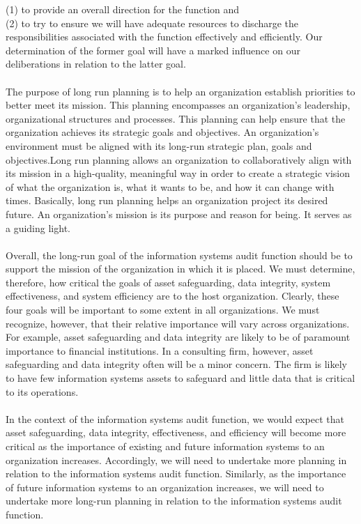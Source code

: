 \documentclass[12pt]{article}
\begin{document}
(1) to provide an overall direction for the function and\\ 
(2) to try to ensure we will have adequate resources to discharge the responsibilities associated with the function effectively and efficiently. Our determination of the former goal will have a marked influence on our deliberations in relation to the latter goal.\\\\
The purpose of long run planning is to help an organization establish priorities to better meet its mission. This planning encompasses an organization’s leadership, organizational structures and processes. This planning can help ensure that the organization achieves its strategic goals and objectives. An organization’s environment must be aligned with its long-run strategic plan, goals and objectives.Long run planning allows an organization to collaboratively align with its mission in a high-quality, meaningful way in order to create a strategic vision of what the organization is, what it wants to be, and how it can change with times. Basically, long run planning helps an organization project its desired future. An organization’s mission is its purpose and reason for being. It serves as a guiding light. \\\\
Overall, the long-run goal of the information systems audit function should be to support the mission of the organization in which it is placed. We must determine, therefore, how critical the goals of asset safeguarding, data integrity, system effectiveness, and system efficiency are to the host organization. Clearly, these four goals will be important to some extent in all organizations. We must recognize, however, that their relative importance will vary across organizations. For example, asset safeguarding and data integrity are likely to be of paramount importance to financial institutions. In a consulting firm, however, asset safeguarding and data integrity often will be a minor concern. The firm is likely to have few information systems assets to safeguard and little data that is critical to its operations.\\\\
In the context of the information systems audit function, we would expect that asset safeguarding, data integrity, effectiveness, and efficiency will become more critical as the importance of existing and future information systems to an organization increases. Accordingly, we will need to undertake more planning in relation to the information systems audit function. Similarly, as the importance of future information systems to an organization increases, we will need to undertake more long-run planning in relation to the information systems audit function.\\\\
\end{document}
